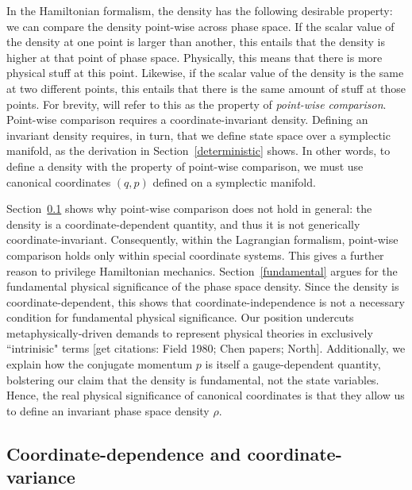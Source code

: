 \documentclass[letterpaper]{article}
\begin{document}
In the Hamiltonian formalism, the density has the following desirable property: we can compare the density point-wise across phase space. If the scalar value of the density at one point is larger than another, this entails that the density is higher at that point of phase space. Physically, this means that there is more physical stuff at this point. Likewise, if the scalar value of the density is the same at two different points, this entails that there is the same amount of stuff at those points. For brevity, will refer to this as the property of \textit{point-wise comparison}. Point-wise comparison requires a coordinate-invariant density. Defining an invariant density requires, in turn, that we define state space over a symplectic manifold, as the derivation in Section~\ref{deterministic} shows. In other words, to define a density with the property of point-wise comparison, we must use canonical coordinates $(q, p)$ defined on a symplectic manifold. 

Section~\ref{dependence} shows why point-wise comparison does not hold in general: the density is a coordinate-dependent quantity, and thus it is not generically coordinate-invariant. Consequently, within the Lagrangian formalism, point-wise comparison holds only within special coordinate systems. This gives a further reason to privilege Hamiltonian mechanics. Section~\ref{fundamental} argues for the fundamental physical significance of the phase space density. Since the density is coordinate-dependent, this shows that coordinate-independence is not a necessary condition for fundamental physical significance. Our position undercuts metaphysically-driven demands to represent physical theories in exclusively ``intrinisic" terms [get citations: Field 1980; Chen papers; North]. Additionally, we explain how the conjugate momentum $p$ is itself a gauge-dependent quantity, bolstering our claim that the density is fundamental, not the state variables. Hence, the real physical significance of canonical coordinates is that they allow us to define an invariant phase space density $\rho $. 

\subsection{Coordinate-dependence and coordinate-variance}
\label{dependence}

\end{document}
